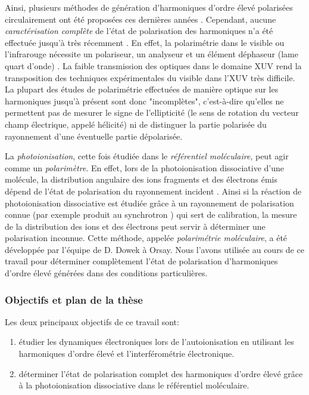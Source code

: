 Ainsi, plusieurs méthodes de génération d'harmoniques d'ordre élevé polarisées circulairement ont été proposées ces dernières années . Cependant, aucune \textit{caractérisation complète} de l'état de polarisation des harmoniques n'a été effectuée jusqu'à très récemment . En effet, la polarimétrie dans le visible ou l'infrarouge nécessite un polariseur, un analyseur et un élément déphaseur (lame quart d'onde) . La faible transmission des optiques dans le domaine XUV rend la transposition des techniques expérimentales du visible dans l'XUV très difficile. La plupart des études de polarimétrie effectuées de manière optique sur les harmoniques jusqu'à présent sont donc "incomplètes", c'est-à-dire qu'elles ne permettent pas de mesurer le signe de l'ellipticité (le sens de rotation du vecteur champ électrique, appelé hélicité) ni de distinguer la partie polarisée du rayonnement d'une éventuelle partie dépolarisée.

La \textit{photoionisation}, cette fois étudiée dans le \textit{référentiel moléculaire}, peut agir comme un \textit{polarimètre}. En effet, lors de la photoionisation dissociative d'une molécule, la distribution angulaire des ions fragments et des électrons émis dépend de l'état de polarisation du rayonnement incident . Ainsi si la réaction de photoionisation dissociative est étudiée grâce à un rayonnement de polarisation connue (par exemple produit au synchrotron ) qui sert de calibration, la mesure de la distribution des ions et des électrons peut servir à déterminer une polarisation inconnue. Cette méthode, appelée \textit{polarimétrie moléculaire}, a été développée par l'équipe de D. Dowek à Orsay. Nous l'avons utilisée au cours de ce travail pour déterminer complètement l'état de polarisation d'harmoniques d'ordre élevé générées dans des conditions particulières.

\subsubsection*{Objectifs et plan de la thèse}
Les deux principaux objectifs de ce travail sont:
\begin{enumerate}
\item étudier les dynamiques électroniques lors de l'autoionisation en utilisant les harmoniques d'ordre élevé et l'interférométrie électronique.
\item déterminer l'état de polarisation complet des harmoniques d'ordre élevé grâce à la photoionisation dissociative dans le référentiel moléculaire.
\end{enumerate}

